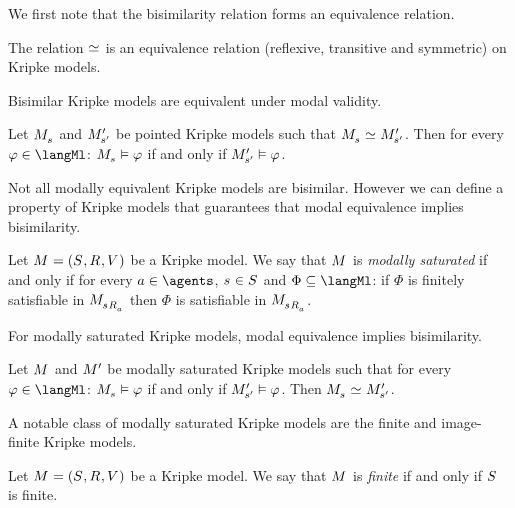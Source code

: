 We first note that the bisimilarity relation forms an equivalence relation.

\begin{proposition}\label{bisimulation-equivalence-relation}
The relation $\bisimilar$ is an equivalence relation (reflexive, transitive and symmetric) on Kripke models.
\end{proposition}

Bisimilar Kripke models are equivalent under modal validity.

\begin{proposition}\label{modal-bisimulation-invariance}
Let $\kPModel{\kStateS}$ and ${M^{\prime}_{{{s}^{\prime}}}}$ be pointed Kripke models such that $\kPModel{\kStateS} \bisimilar \kPModelP{\kStateSP}$.
Then for every $\phi \in \langMl$:
$\kPModel{\kStateS} \entails \phi$ if and only if ${M^{\prime}_{{{s}^{\prime}}}} \vDash \varphi$.
\end{proposition}

Not all modally equivalent Kripke models are bisimilar.
However we can define a property of Kripke models that guarantees that modal equivalence implies bisimilarity.

\begin{definition}
Let $\kModelAndTuple$ be a Kripke model.
We say that $\kModel$ is {\em modally saturated} if and only if for every $\agentA \in \agents$, $\kStateS \in \kStates$ and $\Phi \subseteq \langMl$: if $\Phi$ is finitely satisfiable in $\kPModel{\kSuccessorsA{\kStateS}}$ then $\Phi$ is satisfiable in $\kPModel{\kSuccessorsA{\kStateS}}$.
\end{definition}

For modally saturated Kripke models, modal equivalence implies bisimilarity.

\begin{proposition}\label{modal-hennessy-milner}
Let $\kModel$ and ${M^{\prime}_{}}$ be modally saturated Kripke models such that for every $\phi \in \langMl$: $\kPModel{\kStateS} \entails \phi$ if and only if ${M^{\prime}_{{{s}^{\prime}}}} \vDash \varphi$.
Then $\kPModel{\kStateS} \bisimilar \kPModelP{\kStateSP}$.
\end{proposition}

A notable class of modally saturated Kripke models are the finite and image-finite Kripke models.

\begin{definition}
Let $\kModelAndTuple$ be a Kripke model.
We say that $\kModel$ is {\em finite} if and only if $\kStates$ is finite.
\end{definition}

